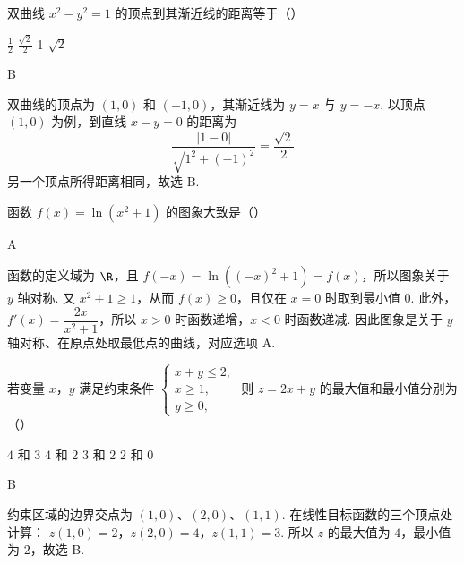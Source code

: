 \begin{problem}
双曲线 \(x^{2} - y^{2} = 1\) 的顶点到其渐近线的距离等于（\quad）

\choices
    {\(\frac{1}{2}\)}
    {\( \frac{\sqrt{2}}{2} \)}
    {1}
    {\(\sqrt{2}\)}
\begin{answer}
B
\end{answer}

\begin{solution}
双曲线的顶点为 \((1,0)\) 和 \((-1,0)\)，其渐近线为 \(y=x\) 与 \(y=-x\). 以顶点 \((1,0)\) 为例，到直线 \(x-y=0\) 的距离为
\[
\frac{|1-0|}{\sqrt{1^2+(-1)^2}}=\frac{\sqrt{2}}{2}
\]
另一个顶点所得距离相同，故选 B.
\end{solution}
\end{problem}

\begin{problem}
函数 \( f(x) = \ln (x^2 + 1) \) 的图象大致是（\quad）

    {}
    {}
    {}
\begin{answer}
A
\end{answer}

\begin{solution}
函数的定义域为 \(\R\)，且 \(f(-x)=\ln((-x)^2+1)=f(x)\)，所以图象关于 \(y\) 轴对称. 又 \(x^2+1\geqslant1\)，从而 \(f(x)\geqslant0\)，且仅在 \(x=0\) 时取到最小值 \(0\). 此外，\(f'(x)=\dfrac{2x}{x^2+1}\)，所以 \(x>0\) 时函数递增，\(x<0\) 时函数递减. 因此图象是关于 \(y\) 轴对称、在原点处取最低点的曲线，对应选项 A.
\end{solution}
\end{problem}

\begin{problem}
若变量 \(x\)，\(y\) 满足约束条件 \(\begin{cases}
x + y \leqslant 2,\\
x \geqslant 1,\\
y \geqslant 0,
\end{cases}\) 则 \(z = 2x + y\) 的最大值和最小值分别为（\quad）

\choices
    {\(4\) 和 \(3\)}
    {\(4\) 和 \(2\)}
    {\(3\) 和 \(2\)}
    {\(2\) 和 \(0\)}
\begin{answer}
B
\end{answer}

\begin{solution}
约束区域的边界交点为 \((1,0)\)、\((2,0)\)、\((1,1)\). 在线性目标函数的三个顶点处计算：
\(z(1,0)=2\)，\(z(2,0)=4\)，\(z(1,1)=3\).
所以 \(z\) 的最大值为 \(4\)，最小值为 \(2\)，故选 B.
\end{solution}
\end{problem}

